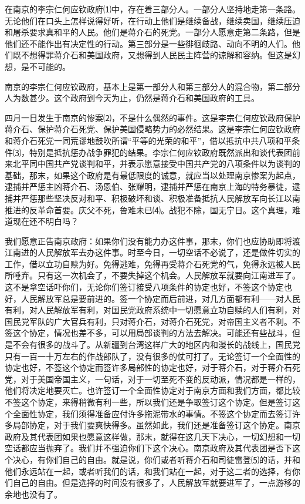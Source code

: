 \documentclass[UTF-8, a5paper, 12pt]{ctexart}
\begin{document}
在南京的李宗仁何应钦政府⑴中，存在着三部分人。一部分人坚持地走第一条路。无论他们在口头上怎样说得好听，在行动上他们是继续备战，继续卖国，继续压迫和屠杀要求真和平的人民。他们是蒋介石的死党。一部分人愿意走第二条路，但是他们还不能作出有决定性的行动。第三部分是一些徘徊歧路、动向不明的人们。他们既不想得罪蒋介石和美国政府，又想得到人民民主阵营的谅解和容纳。但这是幻想，是不可能的。

南京的李宗仁何应钦政府，基本上是第一部分人和第三部分人的混合物，第二部分人为数甚少。这个政府到今天为止，仍然是蒋介石和美国政府的工具。

四月一日发生于南京的惨案⑵，不是什么偶然的事件。这是李宗仁何应钦政府保护蒋介石、保护蒋介石死党、保护美国侵略势力的必然结果。这是李宗仁何应钦政府和蒋介石死党一同荒谬地鼓吹所谓“平等的光荣的和平”，借以抵抗中共八项和平条件⑶，特别是抵抗惩办战争罪犯的结果。李宗仁何应钦政府既然派出和谈代表团前来北平同中国共产党谈判和平，并表示愿意接受中国共产党的八项条件以为谈判的基础，那末，如果这个政府是有最低限度的诚意，就应当以处理南京惨案为起点，逮捕并严惩主凶蒋介石、汤恩伯、张耀明，逮捕并严惩在南京上海的特务暴徒，逮捕并严惩那些坚决反对和平、积极破坏和谈、积极准备抵抗人民解放军向长江以南推进的反革命首要。庆父不死，鲁难未已⑷。战犯不除，国无宁日。这个真理，难道现在还不明白吗？

我们愿意正告南京政府：如果你们没有能力办这件事，那末，你们也应协助即将渡江南进的人民解放军去办这件事。时至今日，一切空话不必说了，还是做件切实的工作，借以立功自赎为好。免得逃难，免得再受蒋介石死党的气，免得永远被人民所唾弃。只有这一次机会了，不要失掉这个机会。人民解放军就要向江南进军了。这不是拿空话吓你们，无论你们签订接受八项条件的协定也好，不签这个协定也好，人民解放军总是要前进的。签一个协定而后前进，对几方面都有利——对人民有利，对人民解放军有利，对国民党政府系统中一切愿意立功自赎的人们有利，对国民党军队的广大官兵有利，只对蒋介石，对蒋介石死党，对帝国主义者不利。不签这个协定，情况也差不多，可以用局部谈判的方法去解决。可能还有些战斗，但是不会有很多的战斗了。从新疆到台湾这样广大的地区内和漫长的战线上，国民党只有一百一十万左右的作战部队了，没有很多的仗可打了。无论签订一个全面性的协定也好，不签这个协定而签许多局部性的协定也好，对于蒋介石，对于蒋介石死党，对于美国帝国主义，一句话，对于一切至死不变的反动派，情况都是一样的，他们将决定地要灭亡。也许签订一个全面性协定对于南京方面和我们方面，都比较不签这个协定，来得稍微有利一些，所以我们还是争取签订这个协定。但是签订这个全面性协定，我们须得准备应付许多拖泥带水的事情。不签这个协定而去签订许多局部协定，对于我们要爽快得多。虽然如此，我们还是准备签订这个协定。南京政府及其代表团如果也愿意这样做，那末，就得在这几天下决心，一切幻想和一切空话都应当抛弃了。我们并不强迫你们下这个决心。南京政府及其代表团是否下这个决心，有你们自己的自由。就是说，你们或者听蒋介石和司徒雷登⑸的话，并和他们永远站在一起，或者听我们的话，和我们站在一起，对于这二者的选择，有你们自己的自由。但是选择的时间没有很多了，人民解放军就要进军了，一点游移的余地也没有了。
\end{document}
